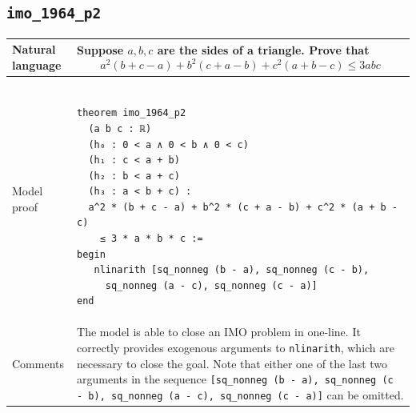 \documentclass[nohyperref]{article}
\theoremstyle{plain}
\theoremstyle{definition}
\theoremstyle{remark}
\begin{document}
\newpage

\subsection*{\texttt{imo\_1964\_p2}} \label{exprob3}
\begin{table}[h]
\begin{small}
\begin{tabular}{|p{3.5cm}|p{12.5cm}|} 
  \hline 
  Natural language & 
  \begin{minipage}{12.5 cm}
    \vspace{0.5em} Suppose $a, b, c$ are the sides of a triangle. Prove that \[a^2(b+c-a)+b^2(c+a-b)+c^2(a+b-c)\le{3abc}\]
  \end{minipage} \\
  \hline 
  \centering Model proof & 
  \begin{minipage}{12.5 cm}
    \begin{verbatim} 
  
theorem imo_1964_p2
  (a b c : ℝ)
  (h₀ : 0 < a ∧ 0 < b ∧ 0 < c)
  (h₁ : c < a + b)
  (h₂ : b < a + c)
  (h₃ : a < b + c) :
  a^2 * (b + c - a) + b^2 * (c + a - b) + c^2 * (a + b - c) 
    ≤ 3 * a * b * c :=
begin
   nlinarith [sq_nonneg (b - a), sq_nonneg (c - b),
     sq_nonneg (a - c), sq_nonneg (c - a)]
end
    \end{verbatim} 
  \end{minipage}\\\hline 
  \centering Comments & The model is able to close an IMO problem in one-line. It correctly provides exogenous arguments to \texttt{nlinarith}, which are necessary to close the goal. Note that either one of the last two arguments in the sequence \texttt{[sq\_nonneg (b - a), sq\_nonneg (c - b), sq\_nonneg (a - c), sq\_nonneg (c - a)]} can be omitted. \\
  \hline
\end{tabular}
\end{small}
\end{table}

\newpage
\end{document}
